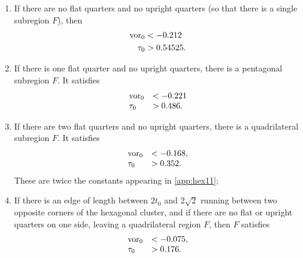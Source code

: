 \begin{enumerate}
\item\label{app:hex1}
 If there are no flat quarters and no upright quarters (so that
there is a single subregion $F$), then
    \begin{eqnarray}%
    \vor_0 &< -0.212\\
    \tau_0 &> 0.54525.
    \end{eqnarray}

\item \label{app:hex2} If there is one flat quarter and no upright
quarters, there is a pentagonal subregion $F$.  It satisfies
    $$
    \begin{array}{lll}
    \operatorname{vor}_0 &< -0.221\\
    \tau_0 &> 0.486.
    \end{array}
    $$

\item\label{app:hex3} If there are two flat quarters and no
upright quarters, there is a quadrilateral subregion $F$.  It
satisfies
    $$
    \begin{array}{lll}
    \operatorname{vor}_0 &< -0.168,\\
    \tau_0 &> 0.352.
    \end{array}
    $$
These are twice the constants appearing in \ref{app:hex11};


\item\label{app:hex4} If there is an edge of length between $2t_0$
and $2\sqrt2$ running between two opposite corners of the
hexagonal cluster, and if there are no flat or upright quarters on
one side, leaving a quadrilateral region $F$, then $F$ satisfies
    $$
    \begin{array}{lll}
    \operatorname{vor}_0 &< -0.075,\\
    \tau_0 &> 0.176.
    \end{array}
    $$


\end{enumerate}
